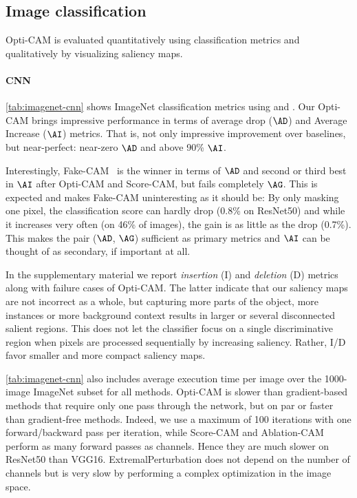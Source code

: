 \subsection{Image classification}

Opti-CAM is evaluated quantitatively using classification metrics and qualitatively 
by visualizing saliency maps.




\paragraph{CNN}

\autoref{tab:imagenet-cnn} shows ImageNet classification metrics using  
and . Our Opti-CAM brings impressive performance in terms of average 
drop ($\AD$) and Average Increase ($\AI$) metrics. That is, not only impressive 
improvement over baselines, but near-perfect: near-zero $\AD$ and above 90\% $\AI$. 

Interestingly, Fake-CAM~\citep{poppi2021revisiting} is the winner in terms of $\AD$ 
and second or third best in $\AI$ after Opti-CAM and Score-CAM, but fails completely 
$\AG$. This is expected and makes Fake-CAM uninteresting as it should be: By only 
masking one pixel, the classification score can hardly drop (0.8\% on ResNet50) and 
while it increases very often (on 46\% of images), the gain is as little as the drop 
(0.7\%). This makes the pair ($\AD$, $\AG$) sufficient as primary metrics and $\AI$ 
can be thought of as secondary, if important at all.

In the supplementary material we report \emph{insertion} (I) and \emph{deletion} (D) 
metrics along with failure cases of Opti-CAM. The latter indicate that our saliency 
maps are not incorrect as a whole, but capturing more parts of the object, more 
instances or more background context results in larger or several disconnected salient 
regions. This does not let the classifier focus on a single discriminative region when 
pixels are processed sequentially by increasing saliency. Rather, I/D favor smaller and 
more compact saliency maps.


\autoref{tab:imagenet-cnn} also includes average execution time per image over the 
1000-image ImageNet subset for all methods. Opti-CAM is slower than gradient-based 
methods that require only one pass through the network, but on par or faster than 
gradient-free methods. Indeed, we use a maximum of 100 iterations with one forward/backward 
pass per iteration, while Score-CAM and Ablation-CAM perform as many forward passes as 
channels. Hence they are much slower on ResNet50 than VGG16. ExtremalPerturbation does 
not depend on the number of channels but is very slow by performing a complex optimization 
in the image space.

